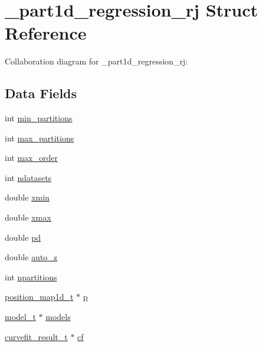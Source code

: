 \hypertarget{struct__part1d__regression__rj}{}\section{\+\_\+part1d\+\_\+regression\+\_\+rj Struct Reference}
\label{struct__part1d__regression__rj}


Collaboration diagram for \+\_\+part1d\+\_\+regression\+\_\+rj\+:
\subsection*{Data Fields}
\begin{DoxyCompactItemize}
\item 
int \hyperlink{struct__part1d__regression__rj_a44ee0bfc943a76c8a9dbd8acb87aeffd}{min\+\_\+partitions}
\item 
int \hyperlink{struct__part1d__regression__rj_ab97c92ee8bb7df0bf96a1357bf2ec738}{max\+\_\+partitions}
\item 
int \hyperlink{struct__part1d__regression__rj_a0ad14d96e6aa8af39fd496359a8856e2}{max\+\_\+order}
\item 
int \hyperlink{struct__part1d__regression__rj_aaa93aadcdc2c46db839b9952d4fa4dd1}{ndatasets}
\item 
double \hyperlink{struct__part1d__regression__rj_a799df9b1af0d41a070efc21472a54c18}{xmin}
\item 
double \hyperlink{struct__part1d__regression__rj_ab178036195fd65240d1b970382539130}{xmax}
\item 
double \hyperlink{struct__part1d__regression__rj_a897d04d7b96f172934bba3e707135eab}{pd}
\item 
double \hyperlink{struct__part1d__regression__rj_a34e609ee44d89b4045c9ffc955963be4}{auto\+\_\+z}
\item 
int \hyperlink{struct__part1d__regression__rj_a585d49fd3d796b1efd1e15bd75c31ef0}{npartitions}
\item 
\hyperlink{position__map1d_8h_aced1bad6e33e2b5679d6d06747735cf6}{position\+\_\+map1d\+\_\+t} $\ast$ \hyperlink{struct__part1d__regression__rj_afc2d3943cc23cc99a52e219d50534e83}{p}
\item 
\hyperlink{part1d__forwardmodel_8c_a0a038e31b1f765296a40c2da07b46a84}{model\+\_\+t} $\ast$ \hyperlink{struct__part1d__regression__rj_af8bd77cda8a8eb5ae298eff20676f960}{models}
\item 
\hyperlink{curvefit_8h_a8d64fc669633daad1b381d40274f9911}{curvefit\+\_\+result\+\_\+t} $\ast$ \hyperlink{struct__part1d__regression__rj_a61cd2a6e82e62f8a26f408a1889fdce5}{cf}

\end{DoxyCompactItemize}
